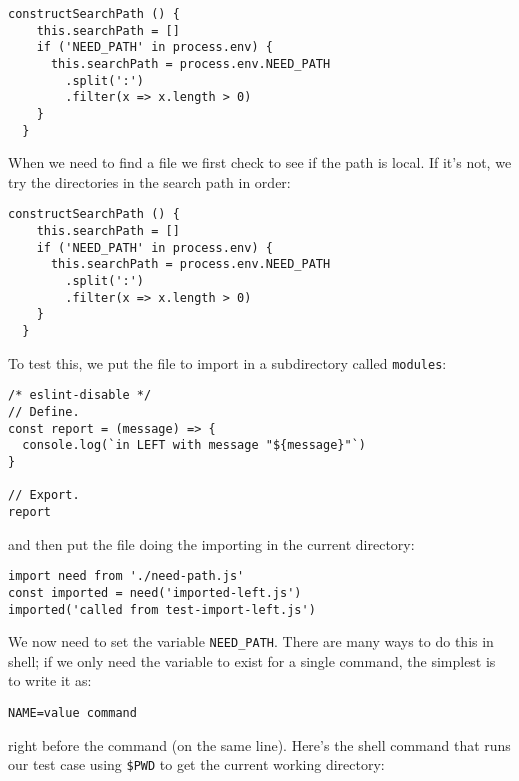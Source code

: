 \documentclass[krantzl]{krantz}
\begin{document}
\begin{lstlisting}[frame=single,frameround=tttt]
  constructSearchPath () {
    this.searchPath = []
    if ('NEED_PATH' in process.env) {
      this.searchPath = process.env.NEED_PATH
        .split(':')
        .filter(x => x.length > 0)
    }
  }
\end{lstlisting}



When we need to find a file we first check to see if the path is local.
If it's not,
we try the directories in the search path in order:


\begin{lstlisting}[frame=single,frameround=tttt]
  constructSearchPath () {
    this.searchPath = []
    if ('NEED_PATH' in process.env) {
      this.searchPath = process.env.NEED_PATH
        .split(':')
        .filter(x => x.length > 0)
    }
  }
\end{lstlisting}



To test this,
we put the file to import in a subdirectory called \texttt{modules}:


\begin{lstlisting}[frame=single,frameround=tttt]
/* eslint-disable */
// Define.
const report = (message) => {
  console.log(`in LEFT with message "${message}"`)
}

// Export.
report
\end{lstlisting}



\noindent and then put the file doing the importing in the current directory:


\begin{lstlisting}[frame=single,frameround=tttt]
import need from './need-path.js'
const imported = need('imported-left.js')
imported('called from test-import-left.js')
\end{lstlisting}



We now need to set the variable \texttt{NEED\_PATH}.
There are many ways to do this in shell;
if we only need the variable to exist for a single command,
the simplest is to write it as:

\begin{lstlisting}[frame=single,frameround=tttt]
NAME=value command
\end{lstlisting}


\noindent right before the command (on the same line).
Here's the shell command that runs our test case
using \texttt{\$PWD} to get the current working directory:
\end{document}
